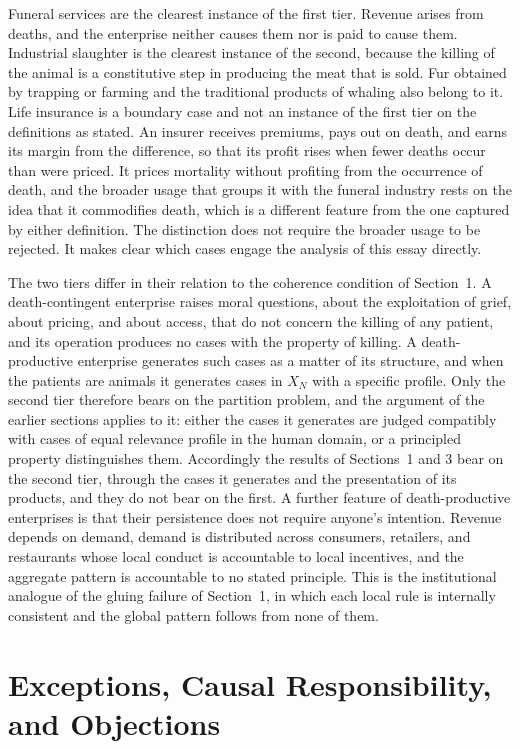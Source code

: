 \documentclass[11pt]{article}
\theoremstyle{definition}
\theoremstyle{plain}
\theoremstyle{definition}
\begin{document}
Funeral services are the clearest instance of the first tier. Revenue arises from deaths, and the enterprise neither causes them nor is paid to cause them. Industrial slaughter is the clearest instance of the second, because the killing of the animal is a constitutive step in producing the meat that is sold. Fur obtained by trapping or farming and the traditional products of whaling also belong to it. Life insurance is a boundary case and not an instance of the first tier on the definitions as stated. An insurer receives premiums, pays out on death, and earns its margin from the difference, so that its profit rises when fewer deaths occur than were priced. It prices mortality without profiting from the occurrence of death, and the broader usage that groups it with the funeral industry rests on the idea that it commodifies death, which is a different feature from the one captured by either definition. The distinction does not require the broader usage to be rejected. It makes clear which cases engage the analysis of this essay directly.

The two tiers differ in their relation to the coherence condition of Section~1. A death-contingent enterprise raises moral questions, about the exploitation of grief, about pricing, and about access, that do not concern the killing of any patient, and its operation produces no cases with the property of killing. A death-productive enterprise generates such cases as a matter of its structure, and when the patients are animals it generates cases in $X_N$ with a specific profile. Only the second tier therefore bears on the partition problem, and the argument of the earlier sections applies to it: either the cases it generates are judged compatibly with cases of equal relevance profile in the human domain, or a principled property distinguishes them. Accordingly the results of Sections~1 and 3 bear on the second tier, through the cases it generates and the presentation of its products, and they do not bear on the first. A further feature of death-productive enterprises is that their persistence does not require anyone's intention. Revenue depends on demand, demand is distributed across consumers, retailers, and restaurants whose local conduct is accountable to local incentives, and the aggregate pattern is accountable to no stated principle. This is the institutional analogue of the gluing failure of Section~1, in which each local rule is internally consistent and the global pattern follows from none of them.

\section{Exceptions, Causal Responsibility, and Objections}
\end{document}
